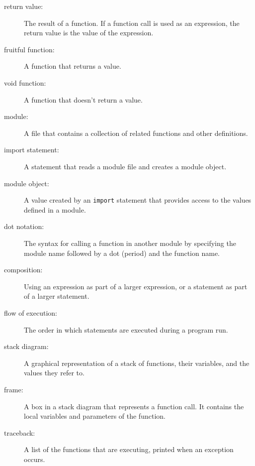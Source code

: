 \documentclass[10pt]{book}
\begin{document}
\begin{description}
\item[return value:]  The result of a function.  If a function call
is used as an expression, the return value is the value of
the expression.

\item[fruitful function:] A function that returns a value.

\item[void function:] A function that doesn't return a value.

\item[module:] A file that contains a
collection of related functions and other definitions.

\item[import statement:] A statement that reads a module file and creates
a module object.

\item[module object:] A value created by an {\tt import} statement
that provides access to the values defined in a module.

\item[dot notation:]  The syntax for calling a function in another
module by specifying the module name followed by a dot (period) and
the function name.

\item[composition:] Using an expression as part of a larger expression,
or a statement as part of a larger statement.

\item[flow of execution:]  The order in which statements are executed during
a program run.

\item[stack diagram:]  A graphical representation of a stack of functions,
their variables, and the values they refer to.

\item[frame:]  A box in a stack diagram that represents a function call.
It contains the local variables and parameters of the function.

\item[traceback:]  A list of the functions that are executing,
printed when an exception occurs.


\end{description}
\end{document}
